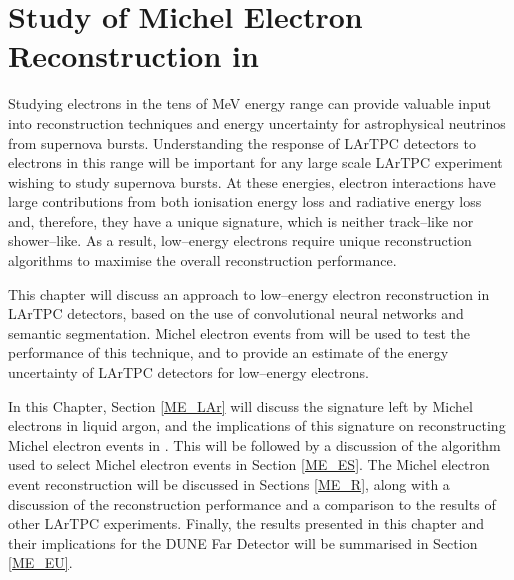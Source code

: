 \chapter{\label{ch:michel}Study of Michel Electron Reconstruction in \protodune{}}

\minitoc

\noindent
Studying electrons in the tens of MeV energy range can provide valuable input
into reconstruction techniques and energy uncertainty for astrophysical
neutrinos from supernova bursts. Understanding the response of LArTPC
detectors to electrons in this range will be important for any large scale
LArTPC experiment wishing to study supernova bursts. At these energies,
electron interactions have large contributions from both ionisation energy
loss and radiative energy loss and, therefore, they have a unique signature,
which is neither track--like nor shower--like. As a result, low--energy 
electrons require unique reconstruction algorithms to maximise the overall 
reconstruction performance.

This chapter will discuss an approach to low--energy electron reconstruction
in LArTPC detectors, based on the use of convolutional neural networks and
semantic segmentation. Michel electron events from \protodune{} will be used
to test the performance of this technique, and to provide an estimate of the
energy uncertainty of LArTPC detectors for low--energy electrons.

In this Chapter, Section \ref{ME_LAr} will discuss the signature left by Michel
electrons in liquid argon, and the implications of this signature on
reconstructing Michel electron events in \protodune{}. This will be followed by
a discussion of the algorithm used to select Michel electron events in Section
\ref{ME_ES}. The Michel electron event reconstruction will be discussed in
Sections \ref{ME_R}, along with a discussion of the reconstruction performance
and a comparison to the results of other LArTPC experiments. Finally, the
results presented in this chapter and their implications for the DUNE Far 
Detector will be summarised in Section \ref{ME_EU}.


